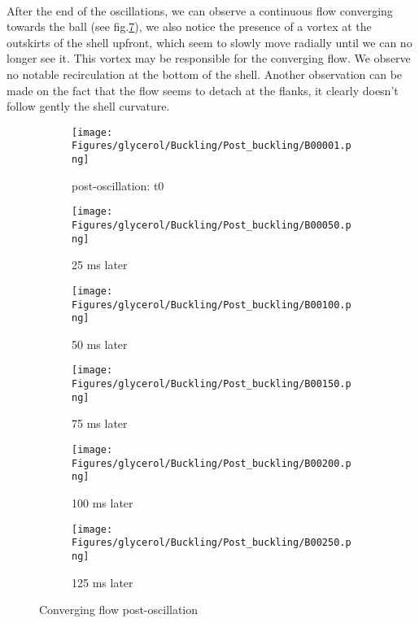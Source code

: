 \documentclass[a4paper,10pt]{report}
\begin{document}
\paragraph{}
After the end of the oscillations, we can observe a continuous flow converging towards the ball (see fig.\ref{fig:convergingflowpostoscillation}), we also notice the presence of a vortex at the outskirts of the shell upfront, which seem to slowly move radially until we can no longer see it. This vortex may be responsible for the converging flow. We observe no notable recirculation at the bottom of the shell. Another observation can be made on the fact that the flow seems to detach at the flanks, it clearly doesn't follow gently the shell curvature.
\begin{figure}[htbp]%
	\centering%
		\begin{subfigure}[h]{0.5\textwidth}%
					\texttt{[image: Figures/glycerol/Buckling/Post\_buckling/B00001.png]}%
					\caption{post-oscillation: t0 }%
					\label{fig:t0_pb}%
			\end{subfigure}%
			\begin{subfigure}[h]{0.5\linewidth}%
					\texttt{[image: Figures/glycerol/Buckling/Post\_buckling/B00050.png]}%
					\caption{25 ms later}%
					\label{fig:50_pb}%
			\end{subfigure}%
			
			\begin{subfigure}[h]{0.5\textwidth}%
					\texttt{[image: Figures/glycerol/Buckling/Post\_buckling/B00100.png]}%
					\caption{50 ms later}%
					\label{fig:100_pb}%
			\end{subfigure}%
			\begin{subfigure}[h]{0.5\linewidth}%
					\texttt{[image: Figures/glycerol/Buckling/Post\_buckling/B00150.png]}%
					\caption{75 ms later}%
					\label{fig:150_pb}%
			\end{subfigure}%
			
			\begin{subfigure}[h]{0.5\textwidth}%
					\texttt{[image: Figures/glycerol/Buckling/Post\_buckling/B00200.png]}%
					\caption{100 ms later}%
					\label{fig:200_pb}%
			\end{subfigure}%
			\begin{subfigure}[h]{0.5\linewidth}%
					\texttt{[image: Figures/glycerol/Buckling/Post\_buckling/B00250.png]}%
					\caption{125 ms later}%
					\label{fig:250_pb}%
			\end{subfigure}%
		\caption{Converging flow post-oscillation}
		\label{fig:convergingflowpostoscillation}%
\end{figure}
\end{document}
